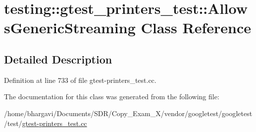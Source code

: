 \hypertarget{classtesting_1_1gtest__printers__test_1_1_allows_generic_streaming}{}\section{testing\+:\+:gtest\+\_\+printers\+\_\+test\+:\+:Allows\+Generic\+Streaming Class Reference}
\label{classtesting_1_1gtest__printers__test_1_1_allows_generic_streaming}


\subsection{Detailed Description}


Definition at line 733 of file gtest-\/printers\+\_\+test.\+cc.



The documentation for this class was generated from the following file\+:\begin{DoxyCompactItemize}
\item 
/home/bhargavi/\+Documents/\+S\+D\+R/\+Copy\+\_\+\+Exam\+\_\+X/vendor/googletest/googletest/test/\hyperlink{gtest-printers__test_8cc}{gtest-\/printers\+\_\+test.\+cc}\end{DoxyCompactItemize}
